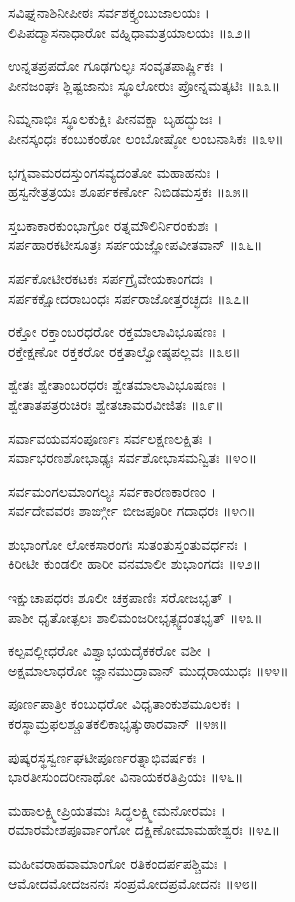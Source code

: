 ಸವಿಘ್ನನಾಶಿನೀಪೀಠಃ ಸರ್ವಶಕ್ತ್ಯಂಬುಜಾಲಯಃ ।\\
ಲಿಪಿಪದ್ಮಾಸನಾಧಾರೋ ವಹ್ನಿಧಾಮತ್ರಯಾಲಯಃ ॥೩೨॥

ಉನ್ನತಪ್ರಪದೋ ಗೂಢಗುಲ್ಫಃ ಸಂವೃತಪಾರ್ಷ್ಣಿಕಃ ।\\
ಪೀನಜಂಘಃ ಶ್ಲಿಷ್ಟಜಾನುಃ ಸ್ಥೂಲೋರುಃ ಪ್ರೋನ್ನಮತ್ಕಟಿಃ ॥೩೩॥

ನಿಮ್ನನಾಭಿಃ ಸ್ಥೂಲಕುಕ್ಷಿಃ ಪೀನವಕ್ಷಾ ಬೃಹದ್ಭುಜಃ ।\\
ಪೀನಸ್ಕಂಧಃ ಕಂಬುಕಂಠೋ ಲಂಬೋಷ್ಠೋ ಲಂಬನಾಸಿಕಃ ॥೩೪॥

ಭಗ್ನವಾಮರದಸ್ತುಂಗಸವ್ಯದಂತೋ ಮಹಾಹನುಃ ।\\
ಹ್ರಸ್ವನೇತ್ರತ್ರಯಃ ಶೂರ್ಪಕರ್ಣೋ ನಿಬಿಡಮಸ್ತಕಃ ॥೩೫॥

ಸ್ತಬಕಾಕಾರಕುಂಭಾಗ್ರೋ ರತ್ನಮೌಲಿರ್ನಿರಂಕುಶಃ ।\\
ಸರ್ಪಹಾರಕಟೀಸೂತ್ರಃ ಸರ್ಪಯಜ್ಞೋಪವೀತವಾನ್ ॥೩೬॥

ಸರ್ಪಕೋಟೀರಕಟಕಃ ಸರ್ಪಗ್ರೈವೇಯಕಾಂಗದಃ ।\\
ಸರ್ಪಕಕ್ಷೋದರಾಬಂಧಃ ಸರ್ಪರಾಜೋತ್ತರಚ್ಛದಃ ॥೩೭॥

ರಕ್ತೋ ರಕ್ತಾಂಬರಧರೋ ರಕ್ತಮಾಲಾವಿಭೂಷಣಃ ।\\
ರಕ್ತೇಕ್ಷಣೋ ರಕ್ತಕರೋ ರಕ್ತತಾಲ್ವೋಷ್ಠಪಲ್ಲವಃ ॥೩೮॥

ಶ್ವೇತಃ ಶ್ವೇತಾಂಬರಧರಃ ಶ್ವೇತಮಾಲಾವಿಭೂಷಣಃ ।\\
ಶ್ವೇತಾತಪತ್ರರುಚಿರಃ ಶ್ವೇತಚಾಮರವೀಜಿತಃ ॥೩೯॥

ಸರ್ವಾವಯವಸಂಪೂರ್ಣಃ ಸರ್ವಲಕ್ಷಣಲಕ್ಷಿತಃ ।\\
ಸರ್ವಾಭರಣಶೋಭಾಢ್ಯಃ ಸರ್ವಶೋಭಾಸಮನ್ವಿತಃ ॥೪೦॥

ಸರ್ವಮಂಗಲಮಾಂಗಲ್ಯಃ ಸರ್ವಕಾರಣಕಾರಣಂ ।\\
ಸರ್ವದೇವವರಃ ಶಾರ್ಙ್ಗೀ ಬೀಜಪೂರೀ ಗದಾಧರಃ ॥೪೧॥

ಶುಭಾಂಗೋ ಲೋಕಸಾರಂಗಃ ಸುತಂತುಸ್ತಂತುವರ್ಧನಃ ।\\
ಕಿರೀಟೀ ಕುಂಡಲೀ ಹಾರೀ ವನಮಾಲೀ ಶುಭಾಂಗದಃ ॥೪೨॥

ಇಕ್ಷುಚಾಪಧರಃ ಶೂಲೀ ಚಕ್ರಪಾಣಿಃ ಸರೋಜಭೃತ್ ।\\
ಪಾಶೀ ಧೃತೋತ್ಪಲಃ ಶಾಲಿಮಂಜರೀಭೃತ್ಸ್ವದಂತಭೃತ್ ॥೪೩॥

ಕಲ್ಪವಲ್ಲೀಧರೋ ವಿಶ್ವಾಭಯದೈಕಕರೋ ವಶೀ ।\\
ಅಕ್ಷಮಾಲಾಧರೋ ಜ್ಞಾನಮುದ್ರಾವಾನ್ ಮುದ್ಗರಾಯುಧಃ ॥೪೪॥

ಪೂರ್ಣಪಾತ್ರೀ ಕಂಬುಧರೋ ವಿಧೃತಾಂಕುಶಮೂಲಕಃ ।\\
ಕರಸ್ಥಾಮ್ರಫಲಶ್ಚೂತಕಲಿಕಾಭೃತ್ಕುಠಾರವಾನ್ ॥೪೫॥

ಪುಷ್ಕರಸ್ಥಸ್ವರ್ಣಘಟೀಪೂರ್ಣರತ್ನಾಭಿವರ್ಷಕಃ ।\\
ಭಾರತೀಸುಂದರೀನಾಥೋ ವಿನಾಯಕರತಿಪ್ರಿಯಃ ॥೪೬॥

ಮಹಾಲಕ್ಷ್ಮೀಪ್ರಿಯತಮಃ ಸಿದ್ಧಲಕ್ಷ್ಮೀಮನೋರಮಃ ।\\
ರಮಾರಮೇಶಪೂರ್ವಾಂಗೋ ದಕ್ಷಿಣೋಮಾಮಹೇಶ್ವರಃ ॥೪೭॥

ಮಹೀವರಾಹವಾಮಾಂಗೋ ರತಿಕಂದರ್ಪಪಶ್ಚಿಮಃ ।\\
ಆಮೋದಮೋದಜನನಃ ಸಂಪ್ರಮೋದಪ್ರಮೋದನಃ ॥೪೮॥

